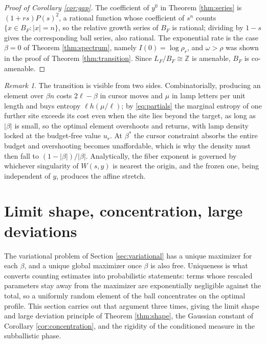 \documentclass[11pt]{amsart}
\theoremstyle{definition}
\theoremstyle{remark}
\newtheorem{remark}[theorem]{Remark}
\newcommand{\Z}{\mathbb{Z}}
\begin{document}
\begin{proof}[Proof of Corollary \ref{cor:gap}]
The coefficient of $y^{0}$ in Theorem \ref{thm:series} is $(1+rs)P(s)^{2}$, a rational function whose coefficient of $s^{n}$ counts $\{x\in B_F:|x|=n\}$, so the relative growth series of $B_F$ is rational; dividing by $1-s$ gives the corresponding ball series, also rational. The exponential rate is the case $\beta=0$ of Theorem \ref{thm:spectrum}, namely $I(0)=\log\rho_r$, and $\omega>\rho$ was shown in the proof of Theorem \ref{thm:transition}. Since $L_F/B_F\cong\Z$ is amenable, $B_F$ is co-amenable.
\end{proof}

\begin{remark}\label{rem:mechanism}
The transition is visible from two sides. Combinatorially, producing an element over $\beta n$ costs $2\ell-\beta$ in cursor moves and $\mu$ in lamp letters per unit length and buys entropy $\ell h(\mu/\ell)$; by \eqref{eq:partials} the marginal entropy of one further site exceeds its cost even when the site lies beyond the target, as long as $|\beta|$ is small, so the optimal element overshoots and returns, with lamp density locked at the budget-free value $u_r$. At $\beta^{*}$ the cursor constraint absorbs the entire budget and overshooting becomes unaffordable, which is why the density must then fall to $(1-|\beta|)/|\beta|$. Analytically, the fiber exponent is governed by whichever singularity of $W(s,y)$ is nearest the origin, and the frozen one, being independent of $y$, produces the affine stretch.
\end{remark}

\section{Limit shape, concentration, large deviations}\label{sec:shape}

The variational problem of Section \ref{sec:variational} has a unique maximizer for each $\beta$, and a unique global maximizer once $\beta$ is also free. Uniqueness is what converts counting estimates into probabilistic statements: terms whose rescaled parameters stay away from the maximizer are exponentially negligible against the total, so a uniformly random element of the ball concentrates on the optimal profile. This section carries out that argument three times, giving the limit shape and large deviation principle of Theorem \ref{thm:shape}, the Gaussian constant of Corollary \ref{cor:concentration}, and the rigidity of the conditioned measure in the subballistic phase.
\end{document}

